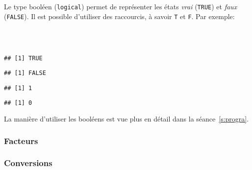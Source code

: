 Le type booléen (\texttt{logical}) permet de représenter les états \emph{vrai} (\texttt{TRUE}) et \emph{faux} (\texttt{FALSE}).
Il est possible d'utiliser des raccourcis, à savoir \texttt{T} et \texttt{F}.
Par exemple:
\begin{knitrout}
\color{fgcolor}\begin{kframe}
\begin{flushleft}
\ttfamily\noindent
{}\hlassignement{\usebox{\hlnormalsizeboxlessthan}-}{\ }\hspace*{\fill}\\
\hlstd{}\hlassignement{\usebox{\hlnormalsizeboxlessthan}-}{\ }\hspace*{\fill}\\
\hlstd{}\mbox{}
\normalfont
\end{flushleft}
\begin{verbatim}
## [1] TRUE
\end{verbatim}
\begin{flushleft}
\ttfamily\noindent
{}\mbox{}
\normalfont
\end{flushleft}
\begin{verbatim}
## [1] FALSE
\end{verbatim}
\begin{flushleft}
\ttfamily\noindent
{}\hlkeyword{+}{\ }\mbox{}
\normalfont
\end{flushleft}
\begin{verbatim}
## [1] 1
\end{verbatim}
\begin{flushleft}
\ttfamily\noindent
{}\hlkeyword{*}{\ }\mbox{}
\normalfont
\end{flushleft}
\begin{verbatim}
## [1] 0
\end{verbatim}
\end{kframe}
\end{knitrout}


La manière d'utiliser les booléens est vue plus en détail dans la séance~\ref{s:progra}.

\subsubsection{Facteurs}

\subsubsection{Conversions}

